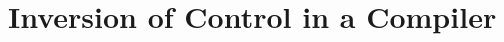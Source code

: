 \documentclass[10pt]{sigplanconf}
\begin{document}


\section{Inversion of Control in a Compiler}\label{inversion}
\end{document}

